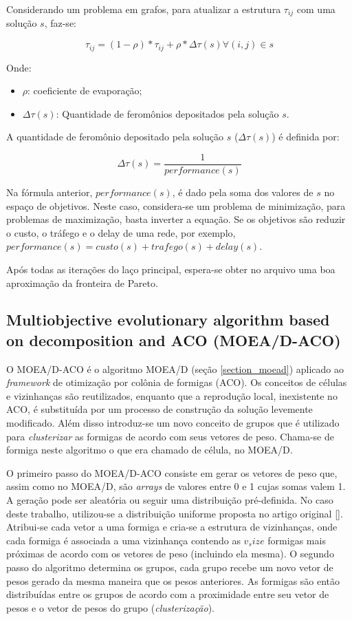 Considerando um problema em grafos, para atualizar a estrutura $\tau_{ij}$ com uma solução $s$, faz-se:

\[\tau_{ij} = (1 - \rho) * \tau_{ij} + \rho * \Delta\tau(s) \forall(i,j) \in s\]

Onde:
\begin{itemize} 
	\item $\rho$: coeficiente de evaporação;
	\item $\Delta\tau(s)$: Quantidade de feromônios depositados pela solução $s$.
\end{itemize}

A quantidade de feromônio depositado pela solução $s$ ($\Delta\tau(s)$) é definida por:

\[\Delta\tau(s) = \frac{1}{performance(s)}\]

Na fórmula anterior, $performance(s)$, é dado pela soma dos valores de $s$ no espaço de objetivos. Neste caso, considera-se um problema de minimização, para problemas de maximização, basta inverter a equação. Se os objetivos são reduzir o custo, o tráfego e o delay de uma rede, por exemplo, $performance(s) = custo(s) + trafego(s) + delay(s)$.

Após todas as iterações do laço principal, espera-se obter no arquivo uma boa aproximação da fronteira de Pareto. 

\subsection{Multiobjective evolutionary algorithm based on decomposition and ACO (MOEA/D-ACO)}
O MOEA/D-ACO \cite{ke2013} é o algoritmo MOEA/D (seção \ref{section_moead}) aplicado ao \textit{framework} de otimização por colônia de formigas (ACO). Os conceitos de células e vizinhanças são reutilizados, enquanto que a reprodução local, inexistente no ACO, é substituída por um processo de construção da solução levemente modificado. Além disso introduz-se um novo conceito de grupos que é utilizado para \textit{clusterizar} as formigas de acordo com seus vetores de peso. Chama-se de formiga neste algoritmo o que era chamado de célula, no MOEA/D.

O primeiro passo do MOEA/D-ACO consiste em gerar os vetores de peso que, assim como no MOEA/D, são \textit{arrays} de valores entre 0 e 1 cujas somas valem 1. A geração pode ser aleatória ou seguir uma distribuição pré-definida. No caso deste trabalho, utilizou-se a distribuição uniforme proposta no artigo original []. Atribui-se cada vetor a uma formiga e cria-se a estrutura de vizinhanças, onde cada formiga é associada a uma vizinhança contendo as $v_size$ formigas mais próximas de acordo com os vetores de peso (incluindo ela mesma). O segundo passo do algoritmo determina os grupos, cada grupo recebe um novo vetor de pesos gerado da mesma maneira que os pesos anteriores. As formigas são então distribuídas entre os grupos de acordo com a proximidade entre seu vetor de pesos e o vetor de pesos do grupo (\textit{clusterização}).

